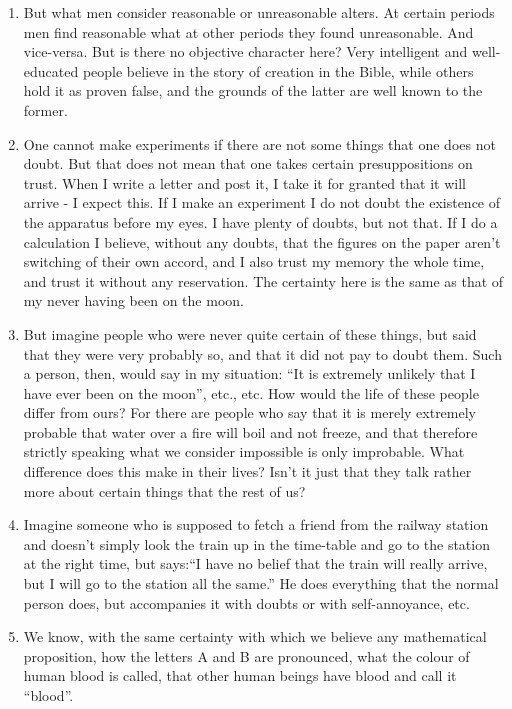 \documentclass{book}
\begin{document}
\begin{enumerate}
\item
But what men consider reasonable or unreasonable alters. At certain periods men
find reasonable what at other periods they found unreasonable. And vice-versa.
But is there no objective character here?  Very intelligent and well-educated
people believe in the story of creation in the Bible, while others hold it as
proven false, and the grounds of the latter are well known to the former.

\item
One cannot make experiments if there are not some things that one does not
doubt. But that does not mean that one takes certain presuppositions on trust.
When I write a letter and post it, I take it for granted that it will arrive -
I expect this.  If I make an experiment I do not doubt the existence of the
apparatus before my eyes. I have plenty of doubts, but not that. If I do a
calculation I believe, without any doubts, that the figures on the paper aren't
switching of their own accord, and I also trust my memory the whole time, and
trust it without any reservation. The certainty here is the same as that of my
never having been on the moon.

\item
But imagine people who were never quite certain of these things, but said that
they were very probably so, and that it did not pay to doubt them. Such a
person, then, would say in my situation: ``It is extremely unlikely that I have
ever been on the moon'', etc., etc. How would the life of these people differ
from ours? For there are people who say that it is merely extremely probable
that water over a fire will boil and not freeze, and that therefore strictly
speaking what we consider impossible is only improbable. What difference does
this make in their lives? Isn't it just that they talk rather more about
certain things that the rest of us?

\item
Imagine someone who is supposed to fetch a friend from the railway station and
doesn't simply look the train up in the time-table and go to the station at the
right time, but says:``I have no belief that the train will really arrive, but
I will go to the station all the same.'' He does everything that the normal
person does, but accompanies it with doubts or with self-annoyance, etc.

\item
We know, with the same certainty with which we believe any mathematical
proposition, how the letters A and B are pronounced, what the colour of human
blood is called, that other human beings have blood and call it ``blood''.


\end{enumerate}
\end{document}
